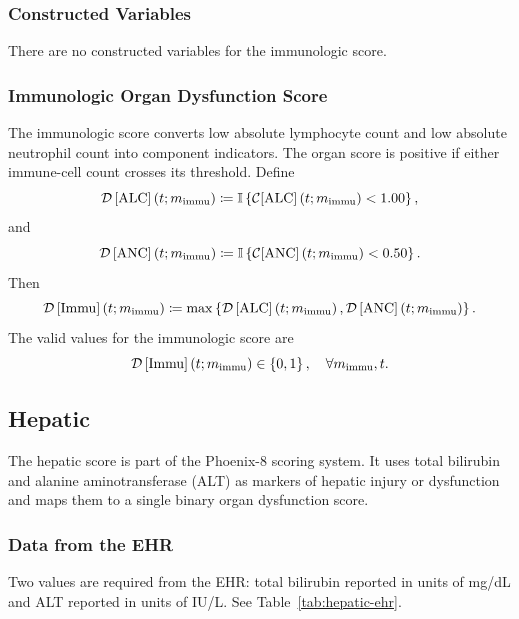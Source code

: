\documentclass[letterpaper,10pt]{article}
\begin{document}
\subsubsection{Constructed Variables}\label{sec:immu-constructed}
There are no constructed variables for the immunologic score.

\subsubsection{Immunologic Organ Dysfunction Score}\label{sec:immu-odss}
The immunologic score converts low absolute lymphocyte count and low absolute
neutrophil count into component indicators. The organ score is positive if
either immune-cell count crosses its threshold.
Define
\begin{equation}
  \label{eq:alc}
  \DS{ALC}[\m{immu}] \coloneqq
  \mathbb{I} \left\{ \CF{ALC}[\m{immu}] < 1.00 \right\},
\end{equation}
and
\begin{equation}
  \label{eq:anc}
  \DS{ANC}[\m{immu}] \coloneqq
  \mathbb{I} \left\{ \CF{ANC}[\m{immu}] < 0.50 \right\}.
\end{equation}
Then
\begin{equation}
  \label{eq:immu}
  \DS{Immu}[\m{immu}] \coloneqq
  \max\left\{
  \DS{ALC}[\m{immu}],
  \DS{ANC}[\m{immu}]
    \right\}.
\end{equation}
The valid values for the immunologic score are
\begin{equation}
  \label{eq:immu-valid-values}
  \DS{Immu}[\m{immu}] \in \left\{0, 1\right\}, \quad
  \forall \m{immu}, t.
\end{equation}

\subsection{Hepatic}\label{sec:hepatic}

The hepatic score is part of the Phoenix-8 scoring system. It uses total
bilirubin and alanine aminotransferase (ALT) as markers of hepatic injury or
dysfunction and maps them to a single binary organ dysfunction score.

\subsubsection{Data from the EHR}\label{sec:hepatic-ehr}
Two values are required from the EHR: total bilirubin reported in units of mg/dL
and ALT reported in units of IU/L. See
Table~\ref{tab:hepatic-ehr}.
\end{document}
